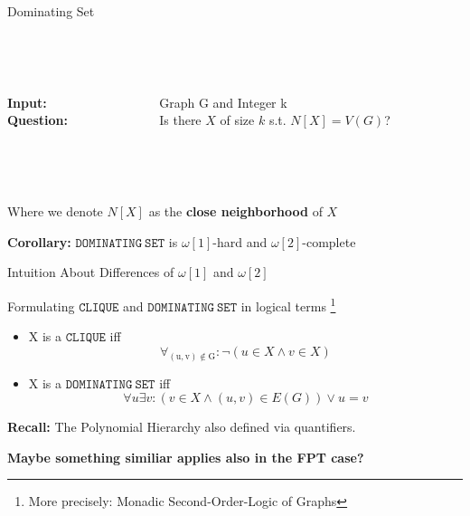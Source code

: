 \begin{frame}[c]{Dominating Set}

\begin{center}
\begin{tcolorbox}[colback=green!5,colframe=green!40!black,title=$\mathtt{DOMINATING~SET}$ (\cite{Cygan2015})]
\begin{columns}[T] %
    \begin{column}{.18\textwidth}
    \\~
    
    \textbf{Input:}\\
    \textbf{Question:}
    \end{column}
    \begin{column}{.78\textwidth}
    \\~
    
    Graph G and Integer k\\
    Is there $X$ of size $k$ s.t. $N[X] = V(G)$?
    
    \end{column}
 \end{columns}
 
\\~

Where we denote $N[X]$ as the \textbf{close neighborhood} of $X$
\end{tcolorbox}
\end{center}

\textbf{Corollary: } $\mathtt{DOMINATING~SET}$ is $\omega[1]$-hard and $\omega[2]$-complete  

\end{frame}

\begin{frame}{Intuition About Differences of $\omega[1]$ and $\omega[2]$}

Formulating $\mathtt{CLIQUE}$ and $\mathtt{DOMINATING~SET}$ in logical terms \footnote{More precisely: Monadic Second-Order-Logic of Graphs}

\begin{center}
\begin{itemize}
    \item X is a $\mathtt{CLIQUE}$ iff $$\forall_{\mathrm{(u,v) \notin G}}: \neg (u \in X \land v \in X) $$
    \item X is a $\mathtt{DOMINATING~SET}$ iff $$\forall u \exists v: (v \in X \land (u,v) \in E(G)) \lor u= v$$
\end{itemize}
\end{center}

\textbf{Recall: } The Polynomial Hierarchy also defined via quantifiers. 

\textbf{Maybe something similiar applies also in the FPT case?}

\end{frame}

